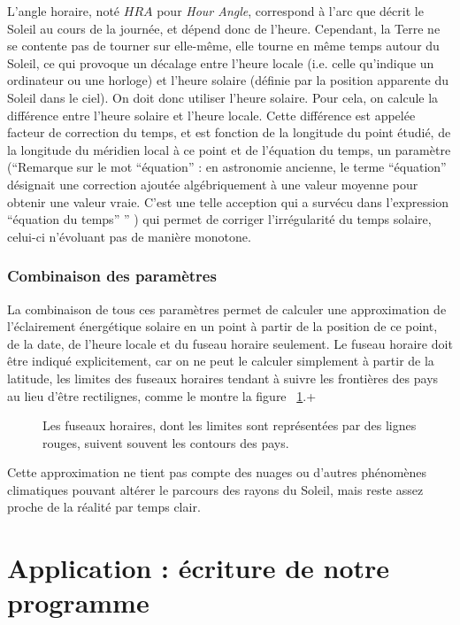\documentclass[12pt]{article}
\begin{document}
L'angle horaire, noté $HRA$ pour \textit{Hour Angle}, correspond à l'arc que décrit le Soleil au cours de la journée, et dépend donc de l'heure.
Cependant, la Terre ne se contente pas de tourner sur elle-même, elle tourne en même temps autour du Soleil, ce qui provoque un décalage entre l'heure locale (i.e. celle qu'indique un ordinateur ou une horloge) et l'heure solaire (définie par la position apparente du Soleil dans le ciel).
On doit donc utiliser l'heure solaire.
Pour cela, on calcule la différence entre l'heure solaire et l'heure locale.
Cette différence est appelée facteur de correction du temps, et est fonction de la longitude du point étudié, de la longitude du méridien local à ce point et de l'équation du temps, un paramètre (``Remarque sur le mot ``équation'' : en astronomie ancienne, le terme ``équation'' désignait une correction ajoutée algébriquement à une valeur moyenne pour obtenir une valeur vraie.
C'est une telle acception qui a survécu dans l'expression ``équation du temps'' '' \cite{equation_temps_wiki}) qui permet de corriger l'irrégularité du temps solaire, celui-ci n'évoluant pas de manière monotone.


\subsubsection{Combinaison des paramètres}
La combinaison de tous ces paramètres permet de calculer une approximation de l'éclairement énergétique solaire en un point à partir de la position de ce point, de la date, de l'heure locale et du fuseau horaire seulement. Le fuseau horaire doit être indiqué explicitement, car on ne peut le calculer simplement à partir de la latitude, les limites des fuseaux horaires tendant à suivre les frontières des pays au lieu d'être rectilignes, comme le montre la figure ~\ref{fig:timezones}.+

\begin{figure}[!ht]
  \centering
  \caption{Les fuseaux horaires, dont les limites sont représentées par des lignes rouges, suivent souvent les contours des pays.}
  \label{fig:timezones}
\end{figure}

Cette approximation ne tient pas compte des nuages ou d'autres phénomènes climatiques pouvant altérer le parcours des rayons du Soleil, mais reste assez proche de la réalité par temps clair.


\clearpage
\section{Application : écriture de notre programme}
\end{document}
